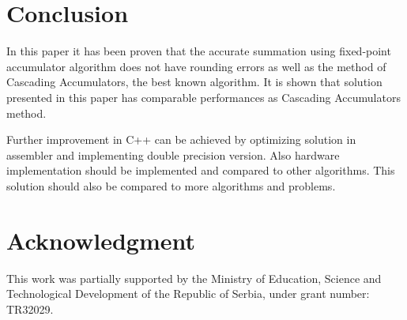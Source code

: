 \documentclass[conference]{IEEEtran}
\begin{document}
\section{Conclusion}
In this paper it has been proven
that the accurate summation using fixed-point accumulator 
algorithm does not have rounding errors as well as the method of Cascading Accumulators,
the best known algorithm.
It is shown that solution presented in this paper has comparable performances as Cascading Accumulators method.
\par
Further improvement in C++ can be achieved by optimizing 
solution in assembler and implementing double precision version.
Also hardware implementation should be implemented and compared to other algorithms.
This solution should also be compared to more algorithms and problems. 

\section*{Acknowledgment}
This work was partially supported by the Ministry of Education, 
Science and Technological Development of the Republic of Serbia, 
under grant number: TR32029.




\end{document}
